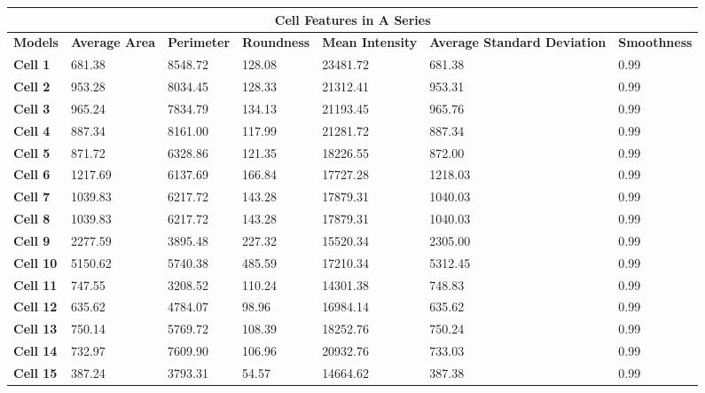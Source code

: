 \documentclass{article}
\begin{document}
\begin{table}[h!]
\centering
\begin{tabular}{ |p{1.7cm}|p{1.7cm}|p{1.7cm}|p{1.7cm}|p{1.7cm}|p{1.7cm}|p{1.7cm}| }
\hline
\multicolumn{7}{|c|}{\textbf{Cell Features in A Series}} \\
\hline
\textbf{Models} & \textbf{Average Area} & \textbf{Perimeter} & \textbf{Roundness} & \textbf{Mean Intensity} & \textbf{Average Standard Deviation} & \textbf{Smoothness} \\
\hline
\textbf{Cell 1} & 681.38 & 8548.72 & 128.08 & 23481.72 & 681.38 & 0.99 \\
\textbf{Cell 2} & 953.28 & 8034.45 & 128.33 & 21312.41 & 953.31 & 0.99 \\
\textbf{Cell 3} & 965.24 & 7834.79 & 134.13 & 21193.45 & 965.76 & 0.99 \\
\textbf{Cell 4} & 887.34 & 8161.00 & 117.99 & 21281.72 & 887.34 & 0.99 \\
\textbf{Cell 5} & 871.72 & 6328.86 & 121.35 & 18226.55 & 872.00 & 0.99 \\
\textbf{Cell 6} & 1217.69 & 6137.69 & 166.84 & 17727.28 & 1218.03 & 0.99 \\
\textbf{Cell 7} & 1039.83 & 6217.72 & 143.28 & 17879.31 & 1040.03 & 0.99 \\
\textbf{Cell 8} & 1039.83 & 6217.72 & 143.28 & 17879.31 & 1040.03 & 0.99 \\
\textbf{Cell 9} & 2277.59 & 3895.48 & 227.32 & 15520.34 & 2305.00 & 0.99 \\
\textbf{Cell 10} & 5150.62 & 5740.38 & 485.59 & 17210.34 & 5312.45 & 0.99 \\
\textbf{Cell 11} & 747.55 & 3208.52 & 110.24 & 14301.38 & 748.83 & 0.99 \\
\textbf{Cell 12} & 635.62 & 4784.07 & 98.96 & 16984.14 & 635.62 & 0.99 \\
\textbf{Cell 13} & 750.14 & 5769.72 & 108.39 & 18252.76 & 750.24 & 0.99 \\
\textbf{Cell 14} & 732.97 & 7609.90 & 106.96 & 20932.76 & 733.03 & 0.99 \\
\textbf{Cell 15} & 387.24 & 3793.31 & 54.57 & 14664.62 & 387.38 & 0.99\\
\hline
\end{tabular}
\end{table}
\end{document}
